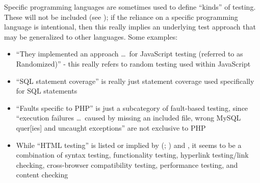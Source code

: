 \ifnotpaper
    Specific programming languages are sometimes used to define ``kinds'' of
    testing. These will not be included (see ); if the reliance
    on a specific programming language is intentional, then this really implies an
    underlying test approach that may be generalized to other languages. Some
    examples:

    \begin{itemize}
        \item ``They implemented an approach \dots\ for JavaScript testing
              (referred to as Randomized)'' \citep[p.~192]{DoğanEtAl2014} -
              this really refers to random testing used within JavaScript
        \item ``SQL statement coverage'' is really just statement coverage
              used specifically for SQL statements \citep[Tab.~13]{DoğanEtAl2014}
        \item ``Faults specific to PHP'' is just a subcategory of fault-based
              testing, since ``execution failures \dots\ caused by missing an
              included file, wrong MySQL quer[ies] and uncaught exceptions''
              are not exclusive to PHP \citep[Tab.~27]{DoğanEtAl2014}
        \item While ``HTML testing'' is listed or implied by
              \citeauthor{Gerrard2000a} (\citeyear[Tab.~2]{Gerrard2000a};
              \citeyear[Tab.~1, p.~3]{Gerrard2000b}) and
              \citet[p.~220]{Patton2006}, it seems to be a combination of syntax
              testing, functionality testing, hyperlink testing/link checking,
              cross-browser compatibility testing, performance testing, and
              content checking \citep[p.~3]{Gerrard2000b}
    \end{itemize}
\fi

